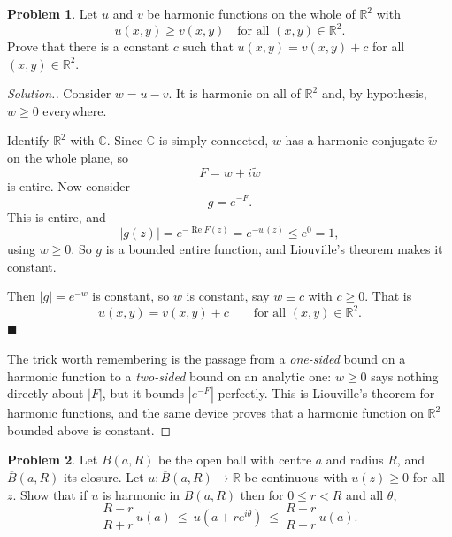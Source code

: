 \documentclass[11pt,a4paper]{article}
\theoremstyle{definition}
\newtheorem{problemx}{Problem}[section]
\newenvironment{problem}{\begin{problemx}}{\end{problemx}}
\newenvironment{solution}
  {\renewcommand{\qedsymbol}{}\begin{proof}[\textit{Solution}.]}
  {\end{proof}}
\begin{document}
\begin{problem}
Let $u$ and $v$ be harmonic functions on the whole of $\mathbb{R}^{2}$ with
$$u(x,y) \geq v(x,y) \quad \text{for all } (x,y) \in \mathbb{R}^{2}.$$
Prove that there is a constant $c$ such that $u(x,y) = v(x,y) + c$ for all
$(x,y) \in \mathbb{R}^{2}$.
\end{problem}

\begin{solution}
Consider $w = u - v$. It is harmonic on all of $\mathbb{R}^{2}$ and, by
hypothesis, $w \geq 0$ everywhere.

Identify $\mathbb{R}^{2}$ with $\mathbb{C}$. Since $\mathbb{C}$ is simply connected,
$w$ has a harmonic conjugate $\widetilde{w}$ on the whole plane, so
$$F = w + i\widetilde{w}$$
is entire. Now consider
$$g = e^{-F}.$$
This is entire, and
$$\left|g(z)\right| = e^{-\operatorname{Re}F(z)} = e^{-w(z)} \leq e^{0} = 1,$$
using $w \geq 0$. So $g$ is a bounded entire function, and Liouville's theorem
makes it constant.

Then $\left|g\right| = e^{-w}$ is constant, so $w$ is constant, say $w \equiv c$
with $c \geq 0$. That is
$$\boxed{u(x,y) = v(x,y) + c \qquad\text{for all } (x,y) \in \mathbb{R}^{2}.}$$
$\blacksquare$

The trick worth remembering is the passage from a \emph{one-sided} bound on a
harmonic function to a \emph{two-sided} bound on an analytic one: $w \geq 0$ says
nothing directly about $\left|F\right|$, but it bounds $\left|e^{-F}\right|$
perfectly. This is Liouville's theorem for harmonic functions, and the same device
proves that a harmonic function on $\mathbb{R}^2$ bounded above is constant.
\end{solution}


\begin{problem}
Let $B(a,R)$ be the open ball with centre $a$ and radius $R$, and
$\overline{B}(a,R)$ its closure. Let
$u : \overline{B}(a,R) \rightarrow \mathbb{R}$ be continuous with
$u(z) \geq 0$ for all $z$. Show that if $u$ is harmonic in $B(a,R)$ then for
$0 \leq r < R$ and all $\theta$,
$$\frac{R - r}{R + r}\,u(a) \ \leq\ u\!\left(a + re^{i\theta}\right)
\ \leq\ \frac{R + r}{R - r}\,u(a).$$
\end{problem}
\end{document}
